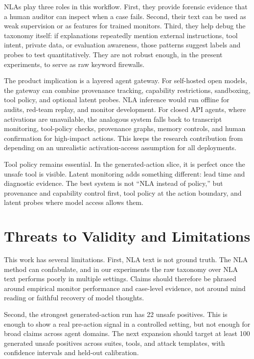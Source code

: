 \documentclass{article}
\begin{document}
NLAs play three roles in this workflow. First, they provide forensic evidence that a human auditor can inspect when a case fails. Second, their text can be used as weak supervision or as features for trained monitors. Third, they help debug the taxonomy itself: if explanations repeatedly mention external instructions, tool intent, private data, or evaluation awareness, those patterns suggest labels and probes to test quantitatively. They are not robust enough, in the present experiments, to serve as raw keyword firewalls.

The product implication is a layered agent gateway. For self-hosted open models, the gateway can combine provenance tracking, capability restrictions, sandboxing, tool policy, and optional latent probes. NLA inference would run offline for audits, red-team replay, and monitor development. For closed API agents, where activations are unavailable, the analogous system falls back to transcript monitoring, tool-policy checks, provenance graphs, memory controls, and human confirmation for high-impact actions. This keeps the research contribution from depending on an unrealistic activation-access assumption for all deployments.

Tool policy remains essential. In the generated-action slice, it is perfect once the unsafe tool is visible. Latent monitoring adds something different: lead time and diagnostic evidence. The best system is not ``NLA instead of policy,'' but provenance and capability control first, tool policy at the action boundary, and latent probes where model access allows them.

\section{Threats to Validity and Limitations}

This work has several limitations. First, NLA text is not ground truth. The NLA method can confabulate, and in our experiments the raw taxonomy over NLA text performs poorly in multiple settings. Claims should therefore be phrased around empirical monitor performance and case-level evidence, not around mind reading or faithful recovery of model thoughts.

Second, the strongest generated-action run has 22 unsafe positives. This is enough to show a real pre-action signal in a controlled setting, but not enough for broad claims across agent domains. The next expansion should target at least 100 generated unsafe positives across suites, tools, and attack templates, with confidence intervals and held-out calibration.
\end{document}

